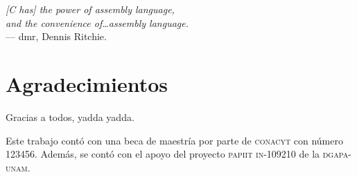 
\begin{flushright}{\slshape    
    [C has] the power of assembly language,\\
and the convenience of\dots assembly language.}\\
\medskip
    --- dmr, Dennis Ritchie.
\end{flushright}



\bigskip

\begingroup
\let\clearpage\relax
\let\cleardoublepage\relax
\let\cleardoublepage\relax
\chapter*{Agradecimientos}
Gracias a todos, yadda yadda.\\

\bigskip

Este trabajo cont\'o con una beca de maestr\'ia por parte de \textsc{conacyt} con n\'umero 123456.
Adem\'as, se cont\'o con el apoyo del proyecto \textsc{papiit in-109210} de la \textsc{dgapa-unam}.
\endgroup



